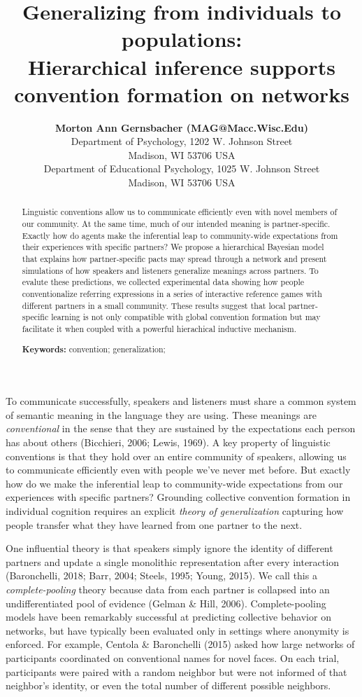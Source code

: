 \documentclass[10pt, letterpaper]{article}
\title{Generalizing from individuals to populations:\\
Hierarchical inference supports convention formation on networks}
\author{{\large \bf Morton Ann Gernsbacher (MAG@Macc.Wisc.Edu)} \\ Department of Psychology, 1202 W. Johnson Street \\ Madison, WI 53706 USA \AND {\large \bf Sharon J.~Derry (SDJ@Macc.Wisc.Edu)} \\ Department of Educational Psychology, 1025 W. Johnson Street \\ Madison, WI 53706 USA}
\begin{document}
\maketitle

\begin{abstract}
Linguistic conventions allow us to communicate efficiently even with
novel members of our community. At the same time, much of our intended
meaning is partner-specific. Exactly how do agents make the inferential
leap to community-wide expectations from their experiences with specific
partners? We propose a hierarchical Bayesian model that explains how
partner-specific pacts may spread through a network and present
simulations of how speakers and listeners generalize meanings across
partners. To evalute these predictions, we collected experimental data
showing how people conventionalize referring expressions in a series of
interactive reference games with different partners in a small
community. These results suggest that local partner-specific learning is
not only compatible with global convention formation but may facilitate
it when coupled with a powerful hierachical inductive mechanism.

\textbf{Keywords:}
convention; generalization;
\end{abstract}

To communicate successfully, speakers and listeners must share a common
system of semantic meaning in the language they are using. These
meanings are \emph{conventional} in the sense that they are sustained by
the expectations each person has about others (Bicchieri, 2006; Lewis,
1969). A key property of linguistic conventions is that they hold over
an entire community of speakers, allowing us to communicate efficiently
even with people we've never met before. But exactly how do we make the
inferential leap to community-wide expectations from our experiences
with specific partners? Grounding collective convention formation in
individual cognition requires an explicit \emph{theory of
generalization} capturing how people transfer what they have learned
from one partner to the next.

One influential theory is that speakers simply ignore the identity of
different partners and update a single monolithic representation after
every interaction (Baronchelli, 2018; Barr, 2004; Steels, 1995; Young,
2015). We call this a \emph{complete-pooling} theory because data from
each partner is collapsed into an undifferentiated pool of evidence
(Gelman \& Hill, 2006). Complete-pooling models have been remarkably
successful at predicting collective behavior on networks, but have
typically been evaluated only in settings where anonymity is enforced.
For example, Centola \& Baronchelli (2015) asked how large networks of
participants coordinated on conventional names for novel faces. On each
trial, participants were paired with a random neighbor but were not
informed of that neighbor's identity, or even the total number of
different possible neighbors.
\end{document}
